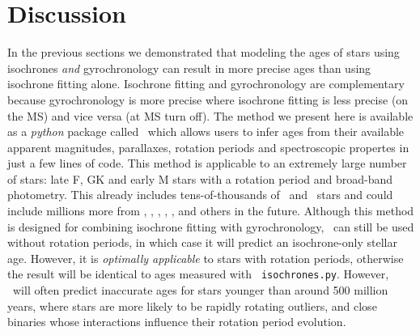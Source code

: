\section{Discussion}
\label{section:discussion}

In the previous sections we demonstrated that modeling the ages of stars using
isochrones {\it and} gyrochronology can result in more precise ages than using
isochrone fitting alone.
Isochrone fitting and gyrochronology are  complementary because gyrochronology
is more precise where isochrone fitting is less precise (on the MS) and vice
versa (at MS turn off).
The method we present here is available as a {\it python} package called \sd\
which allows users to infer ages from their available apparent magnitudes,
parallaxes, rotation periods and spectroscopic propertes in just a few lines
of code.
This method is applicable to an extremely large number of stars: late F, GK
and early M stars with a rotation period and broad-band photometry.
This already includes tens-of-thousands of \kepler\ and \ktwo\ stars and could
include millions more from \tess, \lsst, \wfirst, \plato, \gaia, and others in
the future.
Although this method is designed for combining isochrone fitting with
gyrochronology, \sd\ can still be used without rotation periods, in
which case it will predict an isochrone-only stellar age.
However, it is {\it optimally applicable} to stars with rotation periods,
otherwise the result will be identical to ages measured with {\tt
isochrones.py}.
However, \sd\ will often predict inaccurate ages for stars younger than around
500 million years, where stars are more likely to be rapidly rotating
outliers, and close binaries whose interactions influence their rotation
period evolution.
